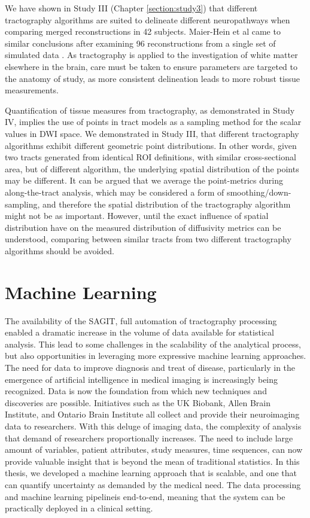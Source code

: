 We have shown in Study III (Chapter \ref{section:study3}) that different tractography algorithms are suited to delineate different neuropathways when comparing merged reconstructions in 42 subjects. Maier-Hein et al came to similar conclusions after examining 96 reconstructions from a single set of simulated data \cite{Maier-Hein2017}. As tractography is applied to the investigation of white matter elsewhere in the brain, care must be taken to ensure parameters are targeted to the anatomy of study, as more consistent delineation leads to more robust tissue measurements.

Quantification of tissue measures from tractography, as demonstrated in Study IV, implies the use of points in tract models as a sampling method for the scalar values in DWI space. We demonstrated in Study III, that different tractography algorithms exhibit different geometric point distributions. In other words, given two tracts generated from identical ROI definitions, with similar cross-sectional area, but of different algorithm, the underlying spatial distribution of the points may be different. It can be argued that we average the point-metrics during along-the-tract analysis, which may be considered a form of smoothing/down-sampling, and therefore the spatial distribution of the tractography algorithm might not be as important. However, until the exact influence of spatial distribution have on the measured distribution of diffusivity metrics can be understood, comparing between similar tracts from two different tractography algorithms should be avoided.

\section{Machine Learning}


The availability of the SAGIT, full automation of tractography processing enabled a dramatic increase in the volume of data available for statistical analysis. This lead to some challenges in the scalability of the analytical process, but also opportunities in leveraging more expressive machine learning approaches. The need for data to improve diagnosis and treat of disease, particularly in the emergence of artificial intelligence in medical imaging is increasingly being recognized. Data is now the foundation from which new techniques and discoveries are possible. Initiatives such as the UK Biobank, Allen Brain Institute, and Ontario Brain Institute all collect and provide their neuroimaging data to researchers. With this deluge of imaging data, the complexity of analysis that demand of researchers proportionally increases. The need to include large amount of variables, patient attributes, study measures, time sequences, can now provide valuable insight that is beyond the mean of traditional statistics. In this thesis, we developed a machine learning approach that is scalable, and one that can quantify uncertainty as demanded by the medical need. The data processing and machine learning pipelineis end-to-end, meaning that the system can be practically deployed in a clinical setting.

